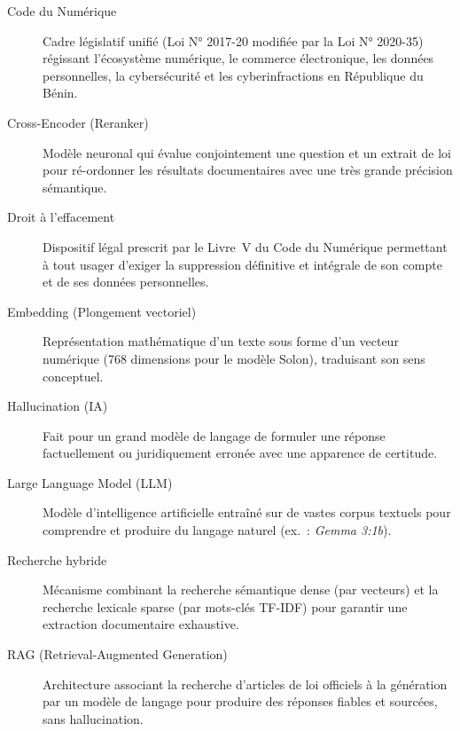 \documentclass{ifri}
\begin{document}
\begin{description}

\item[Code du Numérique]
Cadre législatif unifié (Loi N° 2017-20 modifiée par la Loi N° 2020-35) régissant l'écosystème numérique, le commerce électronique, les données personnelles, la cybersécurité et les cyberinfractions en République du Bénin.

\item[Cross-Encoder (Reranker)]
Modèle neuronal qui évalue conjointement une question et un extrait de loi pour ré-ordonner les résultats documentaires avec une très grande précision sémantique.

\item[Droit à l'effacement]
Dispositif légal prescrit par le Livre~V du Code du Numérique permettant à tout usager d'exiger la suppression définitive et intégrale de son compte et de ses données personnelles.

\item[Embedding (Plongement vectoriel)]
Représentation mathématique d'un texte sous forme d'un vecteur numérique (768 dimensions pour le modèle Solon), traduisant son sens conceptuel.

\item[Hallucination (IA)]
Fait pour un grand modèle de langage de formuler une réponse factuellement ou juridiquement erronée avec une apparence de certitude.

\item[Large Language Model (LLM)]
Modèle d'intelligence artificielle entraîné sur de vastes corpus textuels pour comprendre et produire du langage naturel (ex.~: \textit{Gemma 3:1b}).


\item[Recherche hybride]
Mécanisme combinant la recherche sémantique dense (par vecteurs) et la recherche lexicale sparse (par mots-clés TF-IDF) pour garantir une extraction documentaire exhaustive.

\item[RAG (Retrieval-Augmented Generation)]
Architecture associant la recherche d'articles de loi officiels à la génération par un modèle de langage pour produire des réponses fiables et sourcées, sans hallucination.

\end{description}


\setcounter{page}{1}

\fancyhead[L]{\tiny \leftmark}
\fancyhead[R]{\scriptsize \rightmark}
\fancyfoot[C]{\thepage}
\end{document}
